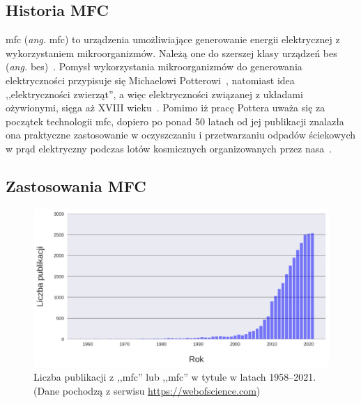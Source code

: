 \subsection{Historia MFC}\label{subsec:historia}
\acrshort{mfc} (\textit{ang.} \acrlong{mfc}) to urządzenia umożliwiające
generowanie energii elektrycznej z wykorzystaniem mikroorganizmów.
Należą one do szerszej klasy urządzeń \acrshort{bes} (\textit{ang.}
\acrlong{bes})~\cite{Santoro2017}.
Pomysł wykorzystania mikroorganizmów do generowania elektryczności
przypisuje się Michaelowi Potterowi~\cite{Potter1911},
natomiast idea ,,elektryczności zwierząt'', a więc elektryczności
związanej z układami ożywionymi, sięga aż XVIII wieku~\cite{Santoro2017}.
Pomimo iż pracę Pottera uważa się za początek technologii \acrshort{mfc},
dopiero po ponad 50 latach od jej publikacji
znalazła ona praktyczne zastosowanie w oczyszczaniu i przetwarzaniu
odpadów ściekowych w prąd elektryczny podczas lotów kosmicznych
organizowanych przez \acrshort{nasa}~\cite{Slate2019}.

\subsection{Zastosowania MFC}\label{subsec:zastosowania-mfc}

\begin{figure}[!b]
    \centering
    \includegraphics[width=12cm]{figures/publications}
    \caption{
        Liczba publikacji z ,,\acrshort{mfc}'' lub
        ,,\acrlong{mfc}'' w tytule w latach 1958--2021.
        (Dane pochodzą z serwisu \url{https://webofscience.com})
    }
    \label{fig:1}
\end{figure}

